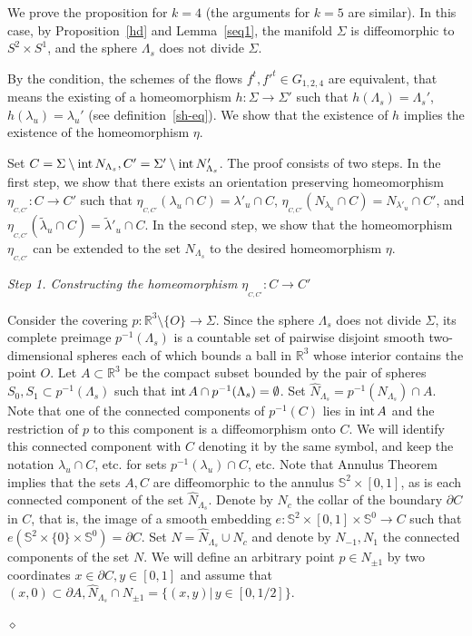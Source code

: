 \documentclass[%
 aip,
 amsmath,amssymb,
preprint,%
]{revtex4-1}
\newenvironment{proof}{{\bf Proof:}}
{\hfill $\diamond$\medskip}
\begin{document}
\begin{proof} We prove the proposition for $k=4$ (the arguments for $k=5$ are similar). In this case, by Proposition~\ref{hd} and Lemma~\ref{seq1}, the manifold $\Sigma$ is diffeomorphic to $S^2\times S^1$, and the sphere $\Lambda_s$ does not divide $\Sigma$.

By the condition, the schemes of the flows  $f^t, {f'}^t\in G_{1,2,4}$ are equivalent,  that  means the  existing of  a homeomorphism $h: \Sigma\to \Sigma'$ such that $h(\Lambda_s)=\Lambda_s'$, $h(\lambda_u)=\lambda_u'$ (see definition~\ref{sh-eq}). We show that the existence of $h$ implies the existence of the homeomorphism $\eta$.

Set $C=\Sigma\setminus {\rm int}\, N_{\Lambda_s}, C'=\Sigma'\setminus {\rm int}\, N'_{\Lambda_s}$. The proof consists of two steps. In the first step, we show that there exists an orientation  preserving homeomorphism $\eta_{_{C,C'}}: C\to C'$ such that $\eta_{_{C,C'}}(\lambda_u\cap C)=\lambda'_u\cap C$,
$\eta_{_{C,C'}}(N_{\lambda_u}\cap C)=N_{\lambda'_u}\cap C'$, and
$\eta_{_{C,C'}}(\widetilde \lambda_u\cap C)=\widetilde \lambda'_u\cap C$. In the second step, we show that the homeomorphism $\eta_{_{C,C'}}$ can be extended to the set $N_{\Lambda_s}$  to  the desired homeomorphism $\eta$.

{\it Step 1. Constructing the homeomorphism $\eta_{_{C,C'}}: C\to C'$}

Consider the covering $p:\mathbb R^3\setminus \{O\}\to \Sigma$.
Since the sphere $\Lambda_s$ does not divide $\Sigma$, its complete preimage $p^{-1}(\Lambda_s)$ is a countable set of pairwise disjoint smooth  two-dimensional spheres  each of which bounds a ball in $\mathbb R^3$ whose interior contains the point $O$. Let $A\subset \mathbb R^3$ be the compact subset bounded by the pair of spheres $S_0, S_{1}\subset p^{-1}(\Lambda_s)$ such that ${\rm int}\, A\cap p^{-1}(\Lambda_s)=\emptyset$. Set $\widehat N_{\Lambda_s}=p^{-1}(N_{\Lambda_s})\cap A$. Note that one of the connected components of $p^{-1}(C)$ lies in ${\rm int}\, A$ and the restriction of $p$ to this component is a diffeomorphism onto $C$. We will identify this connected component with $C$ denoting it by the same symbol, and keep the notation $\lambda_u\cap C$, etc. for sets $p^{-1}(\lambda_u)\cap C$, etc. Note that Annulus Theorem implies that the sets $A, C$ are diffeomorphic to the annulus $\mathbb S^2\times [0,1]$, as is each connected component of the set $\widehat N_{\Lambda_s}$. Denote by $N_{c}$ the collar of the boundary $\partial C$ in $C$, that is, the image of a smooth embedding $e: \mathbb S^2\times [0,1]\times \mathbb S^0\to C$ such that $ e(\mathbb S^2\times \{0\}\times \mathbb S^0)=\partial C$. Set $N=\widehat N_{\Lambda_s}\cup N_c$ and denote by $N_{-1}, N_{1}$ the connected components of the set $N$. We will define an arbitrary point $p\in N_{\pm 1}$ by two coordinates $x\in \partial C, y\in [0,1]$  and assume that $(x,0)\subset \partial A, \widehat N_{\Lambda_s}\cap N_{\pm 1}=\{(x,y)|\, y\in [0,1/2]\}$.


\end{proof}
\end{document}
